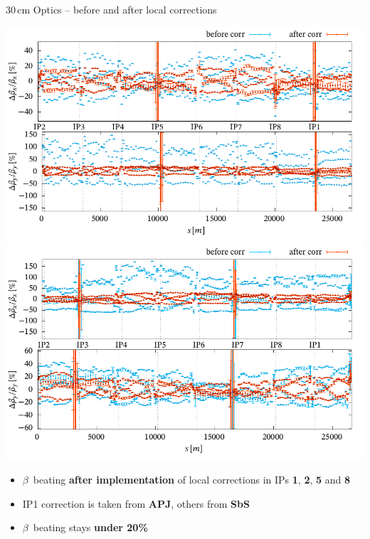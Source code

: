 \documentclass[4pt,usenames,dvipsnames,aspectratio=169]{beamer}
\newcommand{\highl}[1]{\textbf{#1}}
\begin{document}
\begin{frame}{30\,cm Optics -- before and after local corrections}

    \begin{center}
    \includegraphics[width=0.49\linewidth]{images/squeeze/b1_bb_comp.pdf}
    \hfill
    \includegraphics[width=0.49\linewidth]{images/squeeze/b2_bb_comp.pdf}
    \end{center}
    
    \begin{itemize}
        \item $\beta$~beating \highl{after implementation} of local corrections in IPs \textbf{1}, \textbf{2}, \textbf{5} and \textbf{8}
        \item IP1 correction is taken from \highl{APJ}, others from \highl{SbS}
        \item $\beta$~beating stays \highl{under 20\%}
    \end{itemize}
    
\end{frame}
\end{document}
